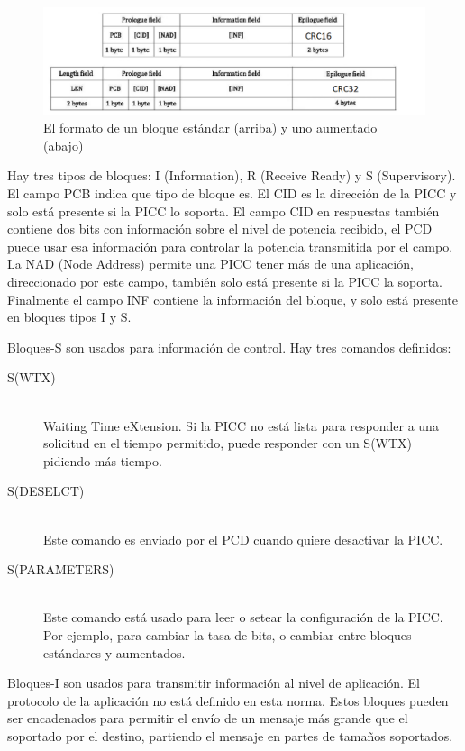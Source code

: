 \documentclass[a4paper, twoside, 11pt]{report}
\begin{document}
\begin{figure}[htb]
  \centering
  \includegraphics[scale=0.52]{./img/bloque_formats}
  \caption{El formato de un bloque estándar (arriba) y uno aumentado (abajo)~\cite{iso14443-4}}
  \label{fig:std_enhanced_blocks}
\end{figure}

Hay tres tipos de bloques: I (Information), R (Receive Ready) y S (Supervisory). El campo PCB indica que tipo de bloque es. El CID es la dirección de la PICC y solo está presente si la PICC lo soporta. El campo CID en respuestas también contiene dos bits con información sobre el nivel de potencia recibido, el PCD puede usar esa información para controlar la potencia transmitida por el campo. La NAD (Node Address) permite una PICC tener más de una aplicación, direccionado por este campo, también solo está presente si la PICC la soporta. Finalmente el campo INF contiene la información del bloque, y solo está presente en bloques tipos I y S.

Bloques-S son usados para información de control. Hay tres comandos definidos:

\begin{description}
  \item[S(WTX)] \hfill \\ Waiting Time eXtension. Si la PICC no está lista para responder a una solicitud en el tiempo permitido, puede responder con un S(WTX) pidiendo más tiempo.
  \item[S(DESELCT)] \hfill \\ Este comando es enviado por el PCD cuando quiere desactivar la PICC.
  \item[S(PARAMETERS)] \hfill \\ Este comando está usado para leer o setear la configuración de la PICC. Por ejemplo, para cambiar la tasa de bits, o cambiar entre bloques estándares y aumentados.
\end{description}

Bloques-I son usados para transmitir información al nivel de aplicación. El protocolo de la aplicación no está definido en esta norma. Estos bloques pueden ser encadenados para permitir el envío de un mensaje más grande que el soportado por el destino, partiendo el mensaje en partes de tamaños soportados.
\end{document}
